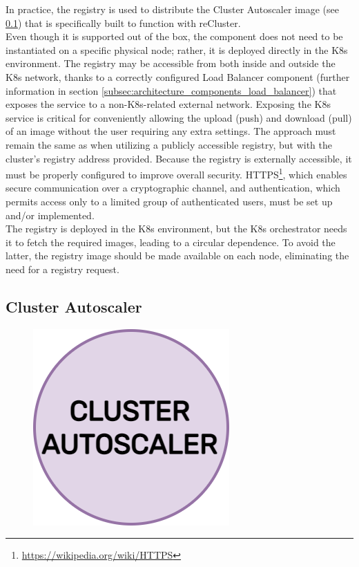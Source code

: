 In practice, the registry is used to distribute the Cluster Autoscaler image (see
\ref{subsec:architecture_components_cluster_autoscaler}) that is specifically built
to function with reCluster. \\ %
Even though it is supported out of the box, the component does not need to be
instantiated on a specific physical node; rather, it is deployed directly in the
K8s environment. The registry may be accessible from both inside and outside the
K8s network, thanks to a correctly configured Load Balancer component (further information
in section \ref{subsec:architecture_components_load_balancer}) that exposes the
service to a non-K8s-related external network. Exposing the K8s service is critical
for conveniently allowing the upload (push) and download (pull) of an image without
the user requiring any extra settings. The approach must remain the same as when
utilizing a publicly accessible registry, but with the cluster's registry address
provided. Because the registry is externally accessible, it must be properly configured
to improve overall security. HTTPS\footnote{\url{https://wikipedia.org/wiki/HTTPS}},
which enables secure communication over a cryptographic channel, and
authentication, which permits access only to a limited group of authenticated users,
must be set up and/or implemented. \\ %
The registry is deployed in the K8s environment, but the K8s orchestrator needs it
to fetch the required images, leading to a circular dependence. To avoid the latter,
the registry image should be made available on each node, eliminating the need for
a registry request.

\subsection{Cluster Autoscaler}
\label{subsec:architecture_components_cluster_autoscaler}

\begin{figure}
  \centering
  \includegraphics[width=.2\textwidth]{
    images/architecture/cluster_autoscaler.png
  }
\end{figure}


